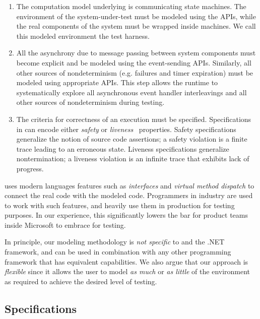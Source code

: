 \begin{enumerate}
\item
The computation model underlying \psharp is communicating state machines. The environment of the system-under-test must be modeled using the \psharp APIs, while the real components of the system must be wrapped inside \psharp machines. We call this modeled environment the \psharp test harness.

\item
All the asynchrony due to message passing between system components must become explicit and be modeled using the \psharp event-sending APIs. Similarly, all other sources of nondeterminism (e.g. failures and timer expiration) must be modeled using appropriate \psharp APIs. This step allows the \psharp runtime to systematically explore all asynchronous event handler interleavings and all other sources of nondeterminism during testing.

\item
The criteria for correctness of an execution must be specified. Specifications in \psharp can encode either \emph{safety} or \emph{liveness}~\cite{lamport1977proving} properties. Safety specifications generalize the notion of source code assertions; a safety violation is a finite trace leading to an erroneous state. Liveness specifications generalize nontermination; a liveness violation is an infinite trace that exhibits lack of progress.
\end{enumerate}

\noindent
\psharp uses modern languages features such as \emph{interfaces} and \emph{virtual method dispatch} to connect the real code with the modeled code. Programmers in industry are used to work with such features, and heavily use them in production for testing purposes. In our experience, this significantly lowers the bar for product teams inside Microsoft to embrace \psharp for testing.

In principle, our modeling methodology is \emph{not specific} to \psharp and the .NET framework, and can be used in combination with any other programming framework that has equivalent capabilities. We also argue that our approach is \emph{flexible} since it allows the user to model \emph{as much} or \emph{as little} of the environment as required to achieve the desired level of testing.

\subsection{Specifications}
\label{sec:bg:bugs}

